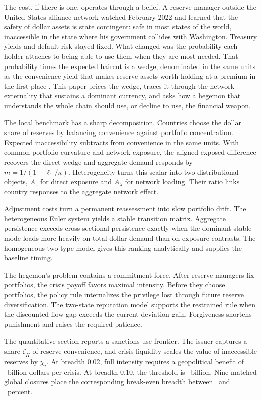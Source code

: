 \documentclass[11pt]{article}
\theoremstyle{definition}
\begin{document}
The cost, if there is one, operates through a belief. A reserve manager outside the United States alliance network watched February 2022 and learned that the safety of dollar assets is state contingent: safe in most states of the world, inaccessible in the state where his government collides with Washington. Treasury yields and default risk stayed fixed. What changed was the probability each holder attaches to being able to use them when they are most needed. That probability times the expected haircut is a wedge, denominated in the same units as the convenience yield that makes reserve assets worth holding at a premium in the first place \citep{KrishnamurthyVissingJorgensen2012}. This paper prices the wedge, traces it through the network externality that sustains a dominant currency, and asks how a hegemon that understands the whole chain should use, or decline to use, the financial weapon.

The local benchmark has a sharp decomposition. Countries choose the dollar share of reserves by balancing convenience against portfolio concentration. Expected inaccessibility subtracts from convenience in the same units. With common portfolio curvature and network exposure, the aligned-exposed difference recovers the direct wedge and aggregate demand responds by $m=1/(1-\ell_1/\kappa)$. Heterogeneity turns this scalar into two distributional objects, $A_z$ for direct exposure and $A_\lambda$ for network loading. Their ratio links country responses to the aggregate network effect.

Adjustment costs turn a permanent reassessment into slow portfolio drift. The heterogeneous Euler system yields a stable transition matrix. Aggregate persistence exceeds cross-sectional persistence exactly when the dominant stable mode loads more heavily on total dollar demand than on exposure contrasts. The homogeneous two-type model gives this ranking analytically and supplies the baseline timing.

The hegemon's problem contains a commitment force. After reserve managers fix portfolios, the crisis payoff favors maximal intensity. Before they choose portfolios, the policy rule internalizes the privilege lost through future reserve diversification. The two-state reputation model supports the restrained rule when the discounted flow gap exceeds the current deviation gain. Forgiveness shortens punishment and raises the required patience.

The quantitative section reports a sanctions-use frontier. The issuer captures a share $\zeta_H$ of reserve convenience, and crisis liquidity scales the value of inaccessible reserves by $\chi_i$. At breadth 0.02, full intensity requires a geopolitical benefit of \GammaThresholdSingle\ billion dollars per crisis. At breadth 0.10, the threshold is \GammaThresholdTen\ billion. Nine matched global closures place the corresponding break-even breadth between \PBEClosureLow\ and \PBEClosureHigh\ percent.
\end{document}
